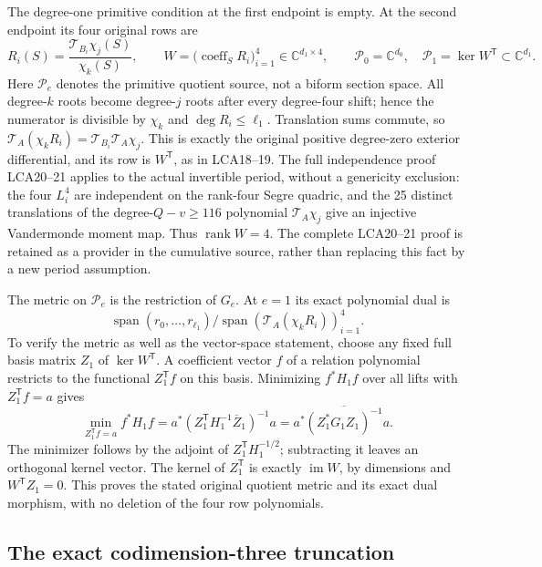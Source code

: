 \documentclass[10pt]{article}
\begin{document}
The degree-one primitive condition at the first endpoint is empty.
At the second endpoint its four original rows are
\[
 R_i(S)=\frac{\mathcal T_{B_i}\chi_j(S)}{\chi_k(S)},\qquad
 W=\bigl(\operatorname{coeff}_{S}R_i\bigr)_{i=1}^4
       \in\mathbb C^{d_1\times4},\qquad
 \mathcal P_0=\mathbb C^{d_0},\quad
 \mathcal P_1=\ker W^{\mathsf T}\subset\mathbb C^{d_1}.
\tag{PDS8}
\]
Here $\mathcal P_e$ denotes the primitive quotient source, not a
biform section space. All degree-$k$ roots become degree-$j$ roots
after every degree-four shift; hence the numerator is divisible by
$\chi_k$ and $\deg R_i\le\ell_1$. Translation sums commute, so
$\mathcal T_A(\chi_kR_i)=\mathcal T_{B_i}\mathcal T_A\chi_j$.
This is exactly the original positive degree-zero exterior
differential, and its row is $W^{\mathsf T}$, as in LCA18--19.
The full independence proof LCA20--21 applies to the actual
invertible period, without a genericity exclusion: the four
$L_i^4$ are independent on the rank-four Segre quadric, and the
25 distinct translations of the degree-$Q-v\ge116$ polynomial
$\mathcal T_A\chi_j$ give an injective Vandermonde moment map.
Thus $\operatorname{rank}W=4$. The complete LCA20--21 proof is
retained as a provider in the cumulative source, rather than
replacing this fact by a new period assumption.

The metric on $\mathcal P_e$ is the restriction of $G_e$.
At $e=1$ its exact polynomial dual is
\[
 \operatorname{span}(r_0,\ldots,r_{\ell_1})\big/
 \operatorname{span}(\mathcal T_A(\chi_kR_i))_{i=1}^4.
\]
To verify the metric as well as the vector-space statement,
choose any fixed full basis matrix $Z_1$ of $\ker W^{\mathsf T}$.
A coefficient vector $f$ of a relation polynomial restricts to the
functional $Z_1^{\mathsf T}f$ on this basis. Minimizing $f^*H_1f$
over all lifts with $Z_1^{\mathsf T}f=a$ gives
\[
 \min_{Z_1^{\mathsf T}f=a}f^*H_1f
 =a^*(Z_1^{\mathsf T}H_1^{-1}\overline Z_1)^{-1}a
 =a^*\overline{(Z_1^*G_1Z_1)^{-1}}a .
\tag{PDS9}
\]
The minimizer follows by the adjoint of
$Z_1^{\mathsf T}H_1^{-1/2}$; subtracting it leaves an orthogonal
kernel vector. The kernel of $Z_1^{\mathsf T}$ is exactly
$\operatorname{im}W$, by dimensions and $W^{\mathsf T}Z_1=0$.
This proves the stated original quotient metric and its exact dual
morphism, with no deletion of the four row polynomials.

\subsection{The exact codimension-three truncation}
\end{document}
